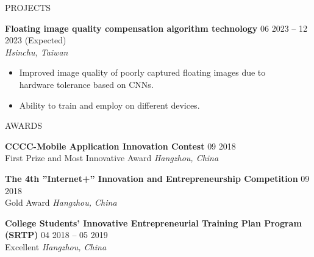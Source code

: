 \documentclass{resume}
\begin{document}
\begin{rSection}{PROJECTS}
    \item \textbf{Floating image quality compensation algorithm technology} \hfill {06 2023 -- 12 2023 (Expected)}\\
    \mbox{} \hfill \textit{Hsinchu, Taiwan}
    \begin{itemize}
        \item Improved image quality of poorly captured floating images due to\\hardware tolerance based on CNNs.
        \item Ability to train and employ on different devices.
    \end{itemize}
\end{rSection} 


\begin{rSection}{AWARDS}
\vspace{-1.25em}
    \item \textbf{CCCC-Mobile Application Innovation Contest} \hfill {09 2018}\\
    {First Prize and Most Innovative Award} \hfill \textit{Hangzhou, China}

    \item \textbf{The 4th ”Internet+” Innovation and Entrepreneurship Competition} \hfill {09 2018}\\
    {Gold Award} \hfill \textit{Hangzhou, China}

    \item \textbf{College Students’ Innovative Entrepreneurial Training Plan Program (SRTP)} \hfill {04 2018 -- 05 2019}\\
    {Excellent} \hfill \textit{Hangzhou, China}
\end{rSection} 


\end{document}
